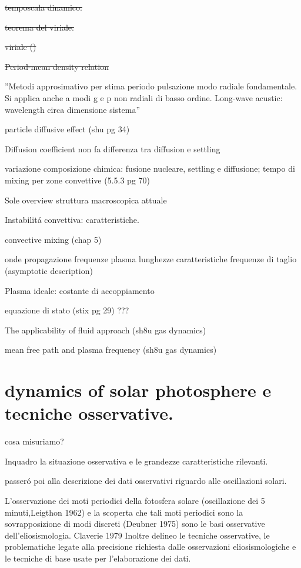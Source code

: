 \documentclass[../main.tex]{subfiles}
\begin{document}
\begin{itemize*}
\item \sout{temposcala dinamico:}
\item \sout{teorema del viriale.}
\item \sout{viriale (\cite{han12stellar})}
\item \sout{Period-mean density relation}
\item ''Metodi approsimativo per stima periodo pulsazione modo radiale fondamentale. Si applica anche a modi g e p non radiali di basso ordine. Long-wave acustic: wavelength circa dimensione sistema''

\item particle diffusive effect (shu pg 34)
\item Diffusion coefficient non fa differenza tra diffusion e settling
\item variazione composizione chimica: fusione nucleare, settling e diffusione; tempo di mixing per zone convettive (5.5.3 pg 70)
\item Sole overview struttura macroscopica attuale
\item Instabilit\'a convettiva: caratteristiche.
\item convective mixing (chap 5)
\item onde propagazione frequenze plasma lunghezze caratteristiche frequenze di taglio (asymptotic description)
\item Plasma ideale: costante di accoppiamento
\item equazione di stato (stix pg 29) ???
\item The applicability of fluid approach (sh8u gas dynamics)
\item mean free path and plasma frequency (sh8u gas dynamics)
\end{itemize*}

\printbibliography[heading=subbibintoc]


\section{dynamics of solar photosphere e tecniche osservative.}

cosa misuriamo?

Inquadro la situazione osservativa e le grandezze caratteristiche rilevanti.

passer\'o poi alla descrizione dei dati osservativi riguardo alle oscillazioni solari.

L'osservazione dei moti periodici della fotosfera solare (oscillazione dei 5 minuti,Leigthon 1962) e la scoperta che tali moti periodici sono la sovrapposizione di modi discreti (Deubner 1975) sono le basi osservative dell'eliosismologia. Claverie 1979
Inoltre delineo le tecniche osservative, le problematiche legate alla precisione richiesta dalle osservazioni eliosismologiche e le tecniche di base usate per l'elaborazione dei dati.
 
\end{document}
